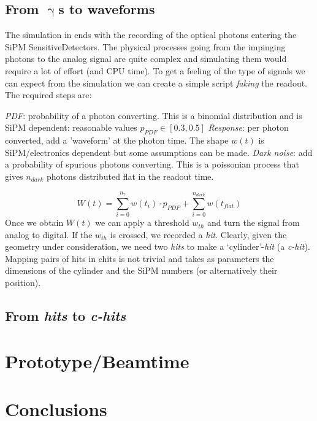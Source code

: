 \begin{refsection}
    \subsection{From $\upgamma$s to waveforms}
        The simulation in \gf ends with the recording of the optical photons entering the SiPM SensitiveDetectors.
        The physical processes going from the impinging photons to the analog signal are quite complex and simulating them would require a lot of effort (and CPU time).
        To get a feeling of the type of signals we can expect from the simulation we can create a simple script \textit{faking} the readout.
        The required steps are:
        \begin{outline}
            \1 \textit{PDF}: probability of a photon converting. 
            This is a binomial distribution and is SiPM dependent: reasonable values $p_{PDF}\in [0.3, 0.5]$
            \1 \textit{Response}: per photon converted, add a 'waveform' at the photon time. 
            The shape $w(t)$ is SiPM/electronics dependent but some assumptions can be made.
            \1 \textit{Dark noise}: add a probability of spurious photons converting. 
            This is a poissonian process that gives $n_{dark}$ photons distributed flat in the readout time.
        \end{outline}
        \begin{equation}
            W(t)=\sum_{i=0}^{n_\gamma} w(t_i)\cdot p_{PDF} + \sum_{i=0}^{n_{dark}} w(t_{flat})
        \end{equation}
        Once we obtain $W(t)$ we can apply a threshold $w_{th}$ and turn the signal from analog to digital. 
        If the $w_{th}$ is crossed, we recorded a \textit{hit}.
        Clearly, given the geometry under consideration, we need two \textit{hits} to make a `cylinder'-\textit{hit} (a \textit{c-hit}).
        Mapping pairs of hits in chits is not trivial and takes as parameters the dimensions of the cylinder and the SiPM numbers (or alternatively their position).

    \subsection{From \textit{hits} to \textit{c-hits}}

\section{Prototype/Beamtime}

\section{Conclusions}

\printbibliography[
    heading = bibliographychapter,
    title=Bibliography on muEDM positron tracker
]

\end{refsection}